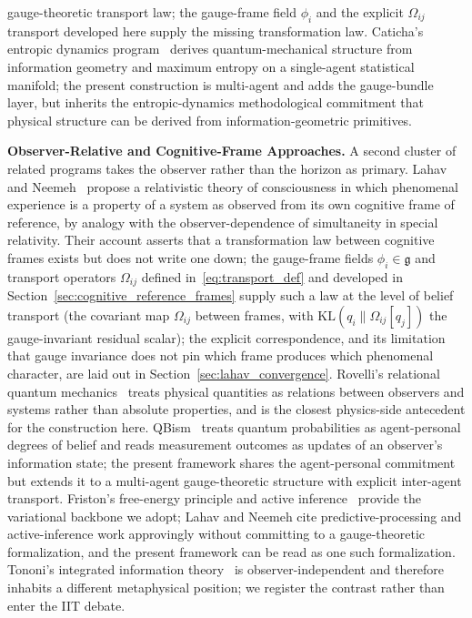 \documentclass[11pt]{article}
\begin{document}
gauge-theoretic transport law; the gauge-frame field $\phi_i$ and the explicit $\Omega_{ij}$ transport developed here supply the missing transformation law. Caticha's entropic dynamics program~\cite{Caticha2019} derives quantum-mechanical structure from information geometry and maximum entropy on a single-agent statistical manifold; the present construction is multi-agent and adds the gauge-bundle layer, but inherits the entropic-dynamics methodological commitment that physical structure can be derived from information-geometric primitives.

\textbf{Observer-Relative and Cognitive-Frame Approaches.} A second cluster of related programs takes the observer rather than the horizon as primary. Lahav and Neemeh~\cite{LahavNeemeh2022, LahavNeemeh2025} propose a relativistic theory of consciousness in which phenomenal experience is a property of a system as observed from its own cognitive frame of reference, by analogy with the observer-dependence of simultaneity in special relativity. Their account asserts that a transformation law between cognitive frames exists but does not write one down; the gauge-frame fields $\phi_i \in \mathfrak{g}$ and transport operators $\Omega_{ij}$ defined in~\eqref{eq:transport_def} and developed in Section~\ref{sec:cognitive_reference_frames} supply such a law at the level of belief transport (the covariant map $\Omega_{ij}$ between frames, with $\mathrm{KL}(q_i \| \Omega_{ij}[q_j])$ the gauge-invariant residual scalar); the explicit correspondence, and its limitation that gauge invariance does not pin which frame produces which phenomenal character, are laid out in Section~\ref{sec:lahav_convergence}. Rovelli's relational quantum mechanics~\cite{Rovelli1996} treats physical quantities as relations between observers and systems rather than absolute properties, and is the closest physics-side antecedent for the construction here. QBism~\cite{Fuchs2014} treats quantum probabilities as agent-personal degrees of belief and reads measurement outcomes as updates of an observer's information state; the present framework shares the agent-personal commitment but extends it to a multi-agent gauge-theoretic structure with explicit inter-agent transport. Friston's free-energy principle and active inference~\cite{Friston2010, Friston2017, parr2022active} provide the variational backbone we adopt; Lahav and Neemeh cite predictive-processing and active-inference work approvingly without committing to a gauge-theoretic formalization, and the present framework can be read as one such formalization. Tononi's integrated information theory~\cite{Tononi2008, Tononi2016} is observer-independent and therefore inhabits a different metaphysical position; we register the contrast rather than enter the IIT debate.
\end{document}
